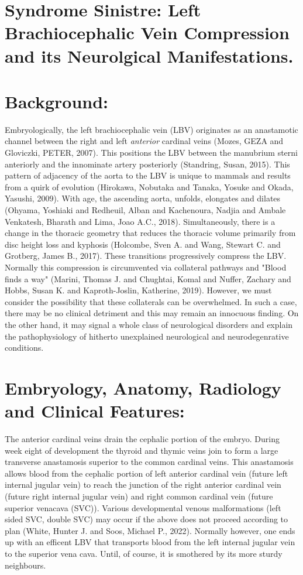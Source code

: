 \documentclass{article}
\author{arcotpixel}
\date{\today}
\title{}
\begin{document}
\section*{Syndrome Sinistre: Left Brachiocephalic Vein Compression and its Neurolgical Manifestations.}
\label{sec:org7be586c}
\section*{Background:}
\label{sec:orgf029216}
Embryologically, the left brachiocephalic vein (LBV) originates as an anastamotic channel between the right and left \emph{anterior} cardinal veins (Mozes, GEZA and Gloviczki, PETER, 2007).
This positions the LBV between the manubrium sterni anteriorly and the innominate artery posteriorly (Standring, Susan, 2015).
This pattern of adjacency of the aorta to the LBV is unique to mammals and results from a quirk of evolution (Hirokawa, Nobutaka and Tanaka, Yosuke and Okada, Yasushi, 2009).
With age, the ascending aorta, unfolds, elongates and dilates (Ohyama, Yoshiaki and Redheuil, Alban and Kachenoura, Nadjia and Ambale Venkatesh, Bharath and Lima, Joao A.C., 2018).
Simultaneously, there is a change in the thoracic geometry that reduces the thoracic volume primarily from disc height loss and kyphosis (Holcombe, Sven A. and Wang, Stewart C. and Grotberg, James B., 2017).
These transitions progressively compress the LBV. Normally this compression is circumvented via collateral pathways and "Blood finds a way" (Marini, Thomas J. and Chughtai, Komal and Nuffer, Zachary and Hobbs, Susan K. and Kaproth-Joslin, Katherine, 2019).
However, we must consider the possibility that these collaterals can be overwhelmed.
In such a case, there may be no clinical detriment and this may remain an innocuous finding.
On the other hand, it may signal a whole class of neurological disorders and explain the pathophysiology of hitherto unexplained neurological and neurodegenrative conditions.

\section*{Embryology, Anatomy, Radiology and Clinical Features:}
\label{sec:orgb3bb50a}
The anterior cardinal veins drain the cephalic portion of the embryo.
During week eight of development the thyroid and thymic veins join to form a large transverse anastamosis superior to the common cardinal veins.
This anastamosis allows blood from the cephalic portion of left anterior cardinal vein (future left internal jugular vein) to reach the junction of the right anterior cardinal vein (future right internal jugular vein) and right common cardinal vein (future superior venacava (SVC)).
Various developmental venous malformations (left sided SVC, double SVC) may occur if the above does not proceed according to plan (White, Hunter J. and Soos, Michael P., 2022).
Normally however, one ends up with an efficent LBV that transports blood from the left internal jugular vein to the superior vena cava.
Until, of course, it is smothered by its more sturdy neighbours.
\end{document}
